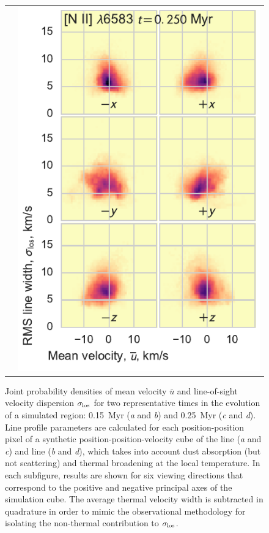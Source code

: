 \documentclass[useAMS,usenatbib]{mn2e}
\begin{document}
\begin{figure}
\begin{tabular}{@{}ll@{}}
    & \includegraphics{hist-vmean-sig-0025-N26584}\\
  \end{tabular}
  \caption{Joint probability densities of mean velocity \(\bar{u}\)
    and line-of-sight velocity dispersion \(\sigma_{\mathrm{los}}\) for two
    representative times in the evolution of a simulated \hii{}
    region: 0.15~Myr (\textit{a} and \textit{b}) and 0.25~Myr
    (\textit{c} and \textit{d}).  Line profile parameters are
    calculated for each position-position pixel of a synthetic
    position-position-velocity cube of the \oiii{} line (\textit{a}
    and \textit{c}) and \nii{} line (\textit{b} and \textit{d}), which
    takes into account dust absorption (but not scattering) and
    thermal broadening at the local temperature. In each subfigure,
    results are shown for six viewing directions that correspond to
    the positive and negative principal axes of the simulation cube.
    The average thermal velocity width is subtracted in quadrature in
    order to mimic the observational methodology for isolating the
    non-thermal contribution to \(\sigma_{\mathrm{los}}\). }
  \label{fig:simulation-vmean-sigma}
\end{figure}
\end{document}
